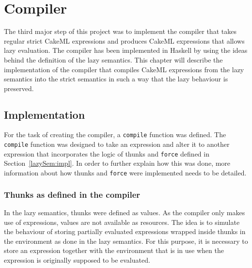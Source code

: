\chapter{Compiler}
\label{chapter:compiler}
The third major step of this project was to implement the compiler that takes
regular strict CakeML expressions and produces CakeML expressions that allows
lazy evaluation. The compiler has been implemented in Haskell by using the ideas
behind the definition of the lazy semantics. This chapter will describe the
implementation of the compiler that compiles CakeML expressions from the lazy
semantics into the strict semantics in such a way that the lazy behaviour
is preserved.

\section{Implementation}

For the task of creating the compiler, a \texttt{compile} function was defined.
The \texttt{compile} function was designed to take an expression and alter it to
another expression that incorporates the logic of thunks and \texttt{force} defined in
Section~\ref{lazySem:impl}. In order to further explain how this was done,
more information about how thunks and \texttt{force} were implemented needs to
be detailed.

\subsection{Thunks as defined in the compiler}
\label{comp:thunk}
In the lazy semantics, thunks were defined as values. As the compiler only makes
use of expressions, values are not available as resources.
The idea is to simulate the behaviour of storing partially evaluated expressions
wrapped inside thunks in the environment as done in the lazy semantics.
For this purpose, it is necessary to store an expression
together with the environment that is in use when the expression is originally
supposed to be evaluated.

